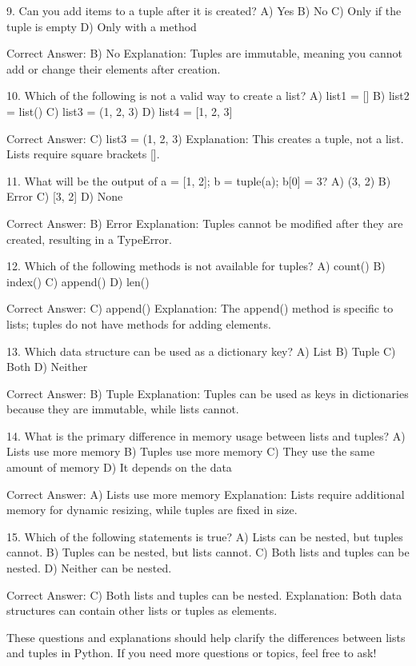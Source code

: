 9. Can you add items to a tuple after it is created?
A) Yes
B) No
C) Only if the tuple is empty
D) Only with a method

Correct Answer: B) No
Explanation: Tuples are immutable, meaning you cannot add or change their elements after creation.

10. Which of the following is not a valid way to create a list?
A) list1 = []
B) list2 = list()
C) list3 = (1, 2, 3)
D) list4 = [1, 2, 3]

Correct Answer: C) list3 = (1, 2, 3)
Explanation: This creates a tuple, not a list. Lists require square brackets [].

11. What will be the output of a = [1, 2]; b = tuple(a); b[0] = 3?
A) (3, 2)
B) Error
C) [3, 2]
D) None

Correct Answer: B) Error
Explanation: Tuples cannot be modified after they are created, resulting in a TypeError.

12. Which of the following methods is not available for tuples?
A) count()
B) index()
C) append()
D) len()

Correct Answer: C) append()
Explanation: The append() method is specific to lists; tuples do not have methods for adding elements.

13. Which data structure can be used as a dictionary key?
A) List
B) Tuple
C) Both
D) Neither

Correct Answer: B) Tuple
Explanation: Tuples can be used as keys in dictionaries because they are immutable, while lists cannot.

14. What is the primary difference in memory usage between lists and tuples?
A) Lists use more memory
B) Tuples use more memory
C) They use the same amount of memory
D) It depends on the data

Correct Answer: A) Lists use more memory
Explanation: Lists require additional memory for dynamic resizing, while tuples are fixed in size.

15. Which of the following statements is true?
A) Lists can be nested, but tuples cannot.
B) Tuples can be nested, but lists cannot.
C) Both lists and tuples can be nested.
D) Neither can be nested.

Correct Answer: C) Both lists and tuples can be nested.
Explanation: Both data structures can contain other lists or tuples as elements.

These questions and explanations should help clarify the differences between lists and tuples in Python. If you need more questions or topics, feel free to ask!






